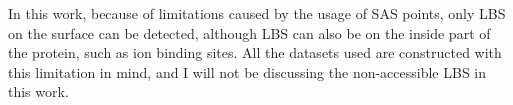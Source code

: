 In this work, because of limitations caused by the usage of SAS points, only LBS on the surface can be detected, although LBS can also be on the inside part of the protein, such as ion binding sites. All the datasets used are constructed with this limitation in mind, and I will not be discussing the non-accessible LBS in this work.